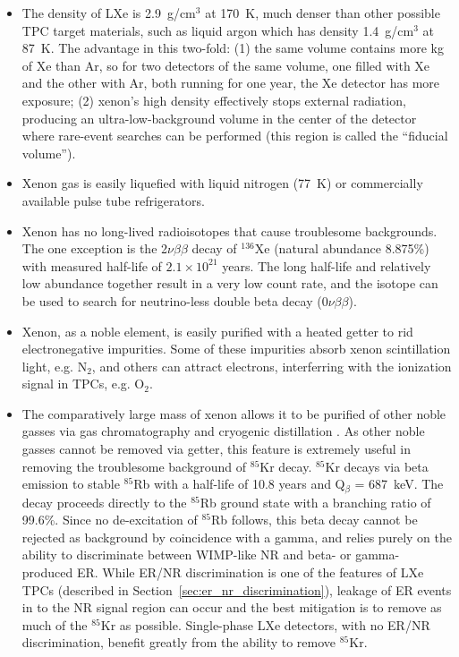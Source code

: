 \begin{itemize}
  \item The density of \ac{LXe} is 2.9~g/cm$^{3}$ at 170~K, much denser than other possible \ac{TPC} target materials, such as liquid argon which has density 1.4~g/cm$^{3}$ at 87~K. The advantage in this two-fold: (1) the same volume contains more kg of Xe than Ar, so for two detectors of the same volume, one filled with Xe and the other with Ar, both running for one year, the Xe detector has more exposure; (2) xenon's high density effectively stops external radiation, producing an ultra-low-background volume in the center of the detector where rare-event searches can be performed (this region is called the ``fiducial volume'').
  
  \item Xenon gas is easily liquefied with liquid nitrogen (77~K) or commercially available pulse tube refrigerators.

  \item Xenon has no long-lived radioisotopes that cause troublesome backgrounds. The one exception is the 2$\nu\beta\beta$ decay of $^{136}$Xe (natural abundance 8.875\%) with measured half-life of $2.1 \times 10^{21}$ years. The long half-life and relatively low abundance together result in a very low count rate, and the isotope can be used to search for neutrino-less double beta decay ($0\nu\beta\beta$).
  
  \item Xenon, as a noble element, is easily purified with a heated getter to rid electronegative impurities. Some of these impurities absorb xenon scintillation light, e.g. N$_{2}$, and others can attract electrons, interferring with the ionization signal in \ac{TPC}s, e.g. O$_{2}$.
  
  \item The comparatively large mass of xenon allows it to be purified of other noble gasses via gas chromatography \cite{LUXKrRemoval2018} and cryogenic distillation \cite{Xe1TKrRemoval2017}. As other noble gasses cannot be removed via getter, this feature is extremely useful in removing the troublesome background of $^{85}$Kr decay. $^{85}$Kr decays via beta emission to stable $^{85}$Rb with a half-life of 10.8 years and Q$_{\beta}$ = 687~keV. The decay proceeds directly to the $^{85}$Rb ground state with a branching ratio of 99.6\%. Since no de-excitation of $^{85}$Rb follows, this beta decay cannot be rejected as background by coincidence with a gamma, and relies purely on the ability to discriminate between WIMP-like \ac{NR} and beta- or gamma- produced \ac{ER}. While ER/NR discrimination is one of the features of \ac{LXe} \ac{TPC}s (described in Section~\ref{sec:er_nr_discrimination}), leakage of \ac{ER} events in to the \ac{NR} signal region can occur and the best mitigation is to remove as much of the  $^{85}$Kr as possible. Single-phase \ac{LXe} detectors, with no ER/NR discrimination, benefit greatly from the ability to remove $^{85}$Kr.
  

\end{itemize}
